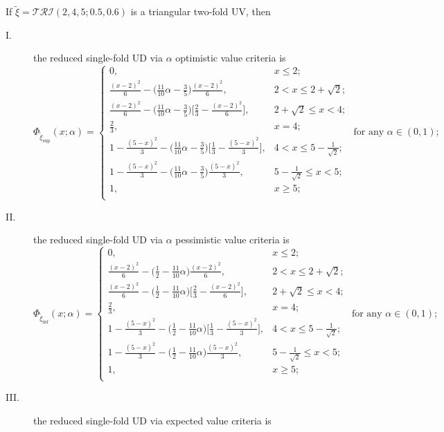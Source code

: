 \begin{example}
	If $\tilde{\xi}=\mathcal{TRI}(2,4,5;0.5,0.6)$ is a triangular two-fold UV, then
	\begin{description}
		\item[I.] the reduced single-fold UD via $\alpha$ optimistic value criteria is 
		\[\Phi_{\tilde{\xi}_{\sup}}(x;\alpha)=\left\{
		\begin{array}{ll}
			0, & x\leq 2;\\
			\frac{(x-2)^2}{6}-\big(\frac{11}{10}\alpha-\frac{3}{5}\big)\frac{(x-2)^2}{6}, & 2<x\leq 2+\sqrt{2};\\
			\frac{(x-2)^2}{6}-\big(\frac{11}{10}\alpha-\frac{3}{5}\big)\big[\frac{2}{3}-\frac{(x-2)^2}{6}\big], & 2+\sqrt{2}\leq x<4;\\
				\frac{2}{3}, & x=4;\\
					1-\frac{(5-x)^2}{3}-\big(\frac{11}{10}\alpha-\frac{3}{5}\big)\big[\frac{1}{3}-\frac{(5-x)^2}{3}\big], & 4<x\leq 5-\frac{1}{\sqrt{2}} ;\\
				1-\frac{(5-x)^2}{3}-\big(\frac{11}{10}\alpha-\frac{3}{5}\big)\frac{(5-x)^2}{3}, &  5-\frac{1}{\sqrt{2}}\leq x<5;\\
					1, & x\geq 5;\\
		\end{array}
		\right.
	\text{ for any }\alpha \in (0,1);	\]
	\item[II.] the reduced single-fold UD via $\alpha$ pessimistic value criteria is 
	\[\Phi_{\tilde{\xi}_{\inf}}(x;\alpha)=\left\{
	\begin{array}{ll}
		0, & x\leq 2;\\
		\frac{(x-2)^2}{6}-\big(\frac{1}{2}-\frac{11}{10}\alpha\big)\frac{(x-2)^2}{6}, & 2<x\leq 2+\sqrt{2};\\
		\frac{(x-2)^2}{6}-\big(\frac{1}{2}-\frac{11}{10}\alpha\big)\big[\frac{2}{3}-\frac{(x-2)^2}{6}\big], & 2+\sqrt{2}\leq x<4;\\
		\frac{2}{3}, & x=4;\\
		1-\frac{(5-x)^2}{3}-\big(\frac{1}{2}-\frac{11}{10}\alpha\big)\big[\frac{1}{3}-\frac{(5-x)^2}{3}\big], & 4<x\leq 5-\frac{1}{\sqrt{2}};\\
		1-\frac{(5-x)^2}{3}-\big(\frac{1}{2}-\frac{11}{10}\alpha\big)\frac{(5-x)^2}{3}, &  5-\frac{1}{\sqrt{2}}\leq x<5;\\
		1, & x\geq 5;\\
	\end{array}
	\right.
\text{ for any }\alpha \in (0,1);	\]
	\item[III.] the reduced single-fold UD via expected value criteria is 

\end{description}
\end{example}

